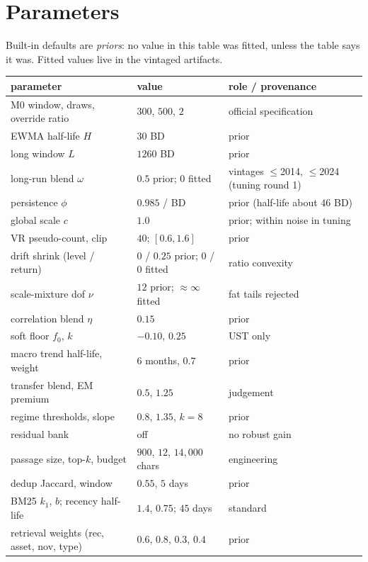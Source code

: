\section{Parameters}\label{app:params}

Built-in defaults are \emph{priors}: no value in this table was fitted, unless the table says it was. Fitted values live in the vintaged artifacts.

\begin{center}
\small
\begin{longtable}{p{}p{}p{}}
\toprule
parameter & value & role / provenance\\
\midrule
\endhead
M0 window, draws, override ratio & $300$, $500$, $2$ & official specification\\
EWMA half-life $H$ & $30$ BD & prior\\
long window $L$ & $1260$ BD & prior\\
long-run blend $\omega$ & $0.5$ prior; $0$ fitted & vintages $\le$2014, $\le$2024 (tuning round 1)\\
persistence $\phi$ & $0.985$ / BD & prior (half-life about $46$ BD)\\
global scale $c$ & $1.0$ & prior; within noise in tuning\\
VR pseudo-count, clip & $40$; $[0.6,1.6]$ & prior\\
drift shrink (level / return) & $0$ / $0.25$ prior; $0$ / $0$ fitted & ratio convexity\\
scale-mixture dof $\nu$ & $12$ prior; $\approx\infty$ fitted & fat tails rejected\\
correlation blend $\eta$ & $0.15$ & prior\\
soft floor $f_0$, $k$ & $-0.10$, $0.25$ & UST only\\
macro trend half-life, weight & $6$ months, $0.7$ & prior\\
transfer blend, EM premium & $0.5$, $1.25$ & judgement\\
regime thresholds, slope & $0.8$, $1.35$, $k=8$ & prior\\
residual bank & off & no robust gain\\
passage size, top-$k$, budget & $900$, $12$, $14{,}000$ chars & engineering\\
dedup Jaccard, window & $0.55$, $5$ days & prior\\
BM25 $k_1$, $b$; recency half-life & $1.4$, $0.75$; $45$ days & standard\\
retrieval weights (rec, asset, nov, type) & $0.6$, $0.8$, $0.3$, $0.4$ & prior\\

\end{longtable}
\end{center}
